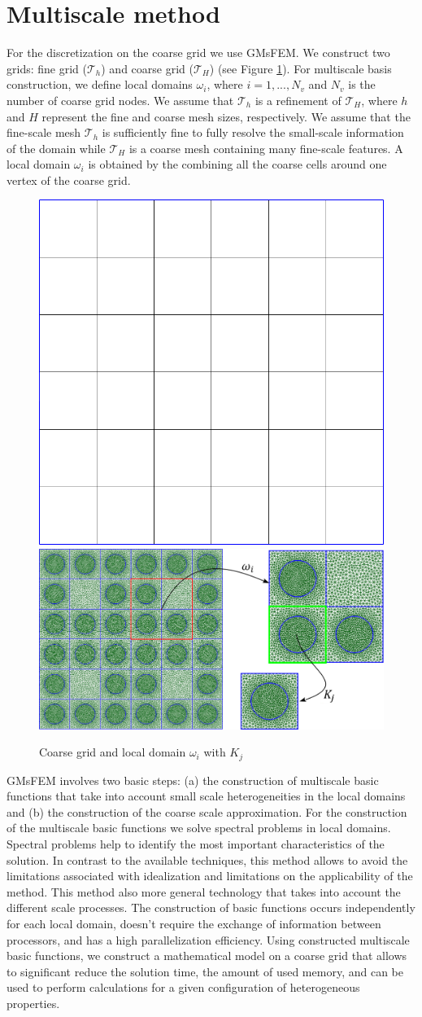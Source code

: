 \documentclass[runningheads]{llncs}
\begin{document}
\section{Multiscale method}
For the discretization on the coarse grid we use GMsFEM.
We construct two grids: fine grid ($\mathcal{T}_h$) and coarse grid ($\mathcal{T}_H$) (see Figure \ref{p1}). 
For multiscale basis construction, we define local domains $\omega_i$, where $i = 1,...,N_v$ and $N_v$ is the number of coarse grid nodes.
We assume that $\mathcal{T}_h$ is a refinement of $\mathcal{T}_H$, where $h$ and $H$ represent the fine and coarse mesh sizes, respectively. 
We assume that the fine-scale mesh $\mathcal{T}_h$ is sufficiently fine to fully resolve the small-scale information of the domain  while $\mathcal{T}_H$ is a coarse mesh containing many fine-scale features.
A local domain $\omega_i$ is obtained by the combining all the coarse cells around one vertex of the coarse grid. 

\begin{figure}[h!]
\centering
\includegraphics[width=0.26\linewidth]{coarse_grid.png}
\hspace{2em}
\includegraphics[width=0.5\linewidth]{omega.png} 
\caption{Coarse grid and local domain $\omega_i$ with $K_j$}
\label{p1}
\end{figure} 

GMsFEM  involves two basic steps: (a) the construction of multiscale basic functions that take into account small scale heterogeneities in the local domains and (b) the construction of the coarse scale approximation. 
For the construction of the multiscale basic functions we solve spectral problems in local domains.
Spectral problems help to identify the most important characteristics of the solution. 
In contrast to the available techniques, this method allows to avoid the limitations associated with idealization and limitations on the applicability of the method.
This method also more general technology that takes into account the different scale processes.
The construction of basic functions occurs independently for each local domain, doesn't require the exchange of information between processors, and  has a high parallelization efficiency.
Using constructed multiscale basic functions, we construct a mathematical model on a coarse grid that allows to significant reduce the solution time, the amount of used memory, and can be used to perform calculations for a given configuration of  heterogeneous properties.
\end{document}
